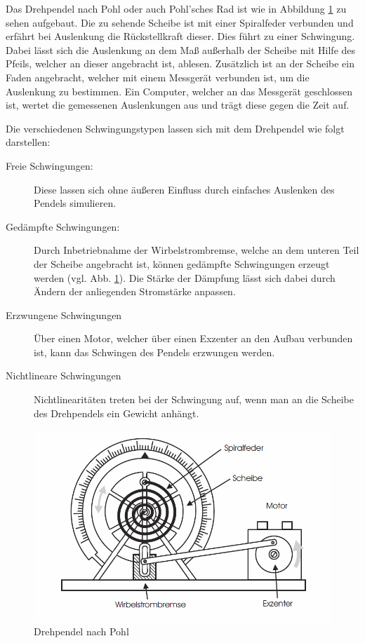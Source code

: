 \documentclass[11pt,a4paper,titlepage, ngerman]{article}
\newcommand{\refabb}[1]{Abb. \ref{abb:#1}}
\begin{document}
		Das Drehpendel nach Pohl oder auch Pohl'sches Rad ist wie in Abbildung \ref{abb:Drehpendel} zu sehen aufgebaut.
		Die zu sehende Scheibe ist mit einer Spiralfeder verbunden und erfährt bei Auslenkung die Rückstellkraft dieser. Dies führt zu einer Schwingung.
		Dabei lässt sich die Auslenkung an dem Maß außerhalb der Scheibe mit Hilfe des Pfeils, welcher an dieser angebracht ist, ablesen. 
		Zusätzlich ist an der Scheibe ein Faden angebracht, welcher mit einem Messgerät verbunden ist, um die Auslenkung zu bestimmen. Ein Computer, welcher an das Messgerät geschlossen ist, wertet die gemessenen Auslenkungen aus und trägt diese gegen die Zeit auf. 
		
		Die verschiedenen Schwingungstypen lassen sich mit dem Drehpendel wie folgt darstellen:
		\begin{description}
			\item[Freie Schwingungen:] 
				Diese lassen sich ohne äußeren Einfluss durch einfaches Auslenken des Pendels simulieren.
			\item[Gedämpfte Schwingungen:]
				 Durch Inbetriebnahme der Wirbelstrombremse, welche an dem unteren Teil der Scheibe angebracht ist, können gedämpfte Schwingungen erzeugt werden (vgl. \refabb{Drehpendel}). Die Stärke der Dämpfung lässt sich dabei durch Ändern der anliegenden Stromstärke anpassen. 
			\item[Erzwungene Schwingungen]
				Über einen Motor, welcher über einen Exzenter an den Aufbau verbunden ist, kann das Schwingen des Pendels erzwungen werden. 
			\item[Nichtlineare Schwingungen]
				Nichtlinearitäten treten bei der Schwingung auf, wenn man an die Scheibe des Drehpendels ein Gewicht anhängt.
		\end{description}
		\begin{figure}[ht]
			\includegraphics[width=\textwidth]{Drehpendel.png}
			\caption{Drehpendel nach Pohl}
			\label{abb:Drehpendel}
		\end{figure}
		
\end{document}
